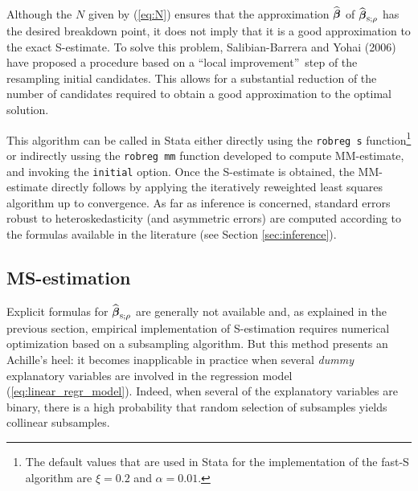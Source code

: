 Although the $N$ given by (\ref{eq:N}) ensures that the approximation
$\widehat{\boldsymbol\beta}$ of $\sthat{\boldsymbol\beta}_{\stsc{S}%
;\rho}$ has the desired breakdown point, it does not imply that it is a good
approximation to the exact S-estimate. To solve this problem, Salibian-Barrera
and Yohai (2006) have proposed a procedure based on a \textquotedblleft local
improvement\textquotedblright\ step of the resampling initial candidates. This
allows for a substantial reduction of the number of candidates required to
obtain a good approximation to the optimal solution.

This algorithm can be called in Stata either directly using the \texttt{robreg
s} function\footnote{The default values that are used in Stata for the
implementation of the fast-S algorithm are $\xi=0.2$ and $\alpha=0.01$.} or
indirectly ussing the \texttt{robreg mm} function developed to compute
MM-estimate, and invoking the \texttt{initial} option. Once the S-estimate is
obtained, the MM-estimate directly follows by applying the iteratively
reweighted least squares algorithm up to convergence. As far as inference is
concerned, standard errors robust to heteroskedasticity (and asymmetric
errors) are computed according to the formulas available in the literature
(see Section \ref{sec:inference}).

\subsection{MS-estimation}

Explicit formulas for $\sthat{\boldsymbol\beta}_{\stsc{S};\rho}$ are
generally not available and, as explained in the previous section, empirical
implementation of S-estimation requires numerical optimization based on a
subsampling algorithm. But this method presents an Achille's heel: it becomes
inapplicable in practice when several \emph{dummy} explanatory variables are
involved in the regression model (\ref{eq:linear_regr_model}). Indeed, when
several of the explanatory variables are binary, there is a high probability
that random selection of subsamples yields collinear subsamples.

